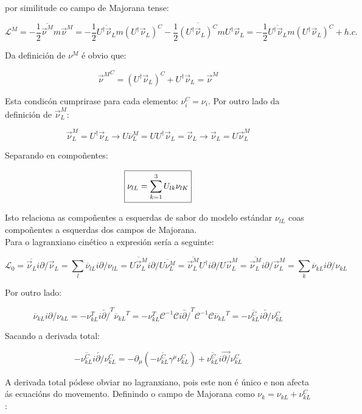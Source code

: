 \documentclass[a4paper,10pt]{article}
\newcommand{\beq}{\begin{equation}}
\newcommand{\eeq}{\end{equation}}
\newcommand{\bbx}{\begin{boxed}}
\newcommand{\ebx}{\end{boxed}}
\newcommand{\barra}[1]{\overline{#1}}
\newcommand{\h}[1]{#1^\dagger}
\newcommand{\lvec}[1]{\overleftarrow{#1}}
\newcommand{\rvec}[1]{\overrightarrow{#1}}
\newcommand{\chula}[1]{\mathcal{#1}}
\newcommand{\slx}[1]{ #1\!\!\!/ }
\begin{document}
por similitude co campo de Majorana tense:

\beq
\chula L^M = -\frac{1}{2} \barra{\rvec\nu^M} m \rvec\nu^M = -\frac{1}{2} \barra{\h U \rvec\nu_L} m \left( \h U \rvec\nu_L  \right)^C - \frac{1}{2} \barra{\left( \h U \rvec\nu_L \right)^C} m \h U \rvec\nu_L = -\frac{1}{2} \barra{\h U \rvec\nu_L} m \left( \h U \rvec\nu_L \right)^C + h.c.
\eeq

Da definición de $\nu^M$ é obvio que:

\beq
{\rvec\nu^M}^C = \left( \h U \rvec\nu_L \right)^C + \h U \rvec\nu_L = \rvec\nu^M
\eeq

Esta condicón cumprirase para cada elemento: $\nu_i^C=\nu_i$. Por outro lado da definición de $\rvec\nu_L^M$:

\beq
\rvec\nu_L^M = \h U \rvec\nu_L \rightarrow U \barra\nu_L^M = U \h U \rvec\nu_L = \rvec\nu_L \rightarrow \rvec\nu_L = U \rvec\nu_L^M
\eeq

Separando en compoñentes:

\beq
\bbx{
\nu_{lL} = \sum_{k=1}^3 U_{lk} \nu_{lK}
}\ebx
\eeq

Isto relaciona as compoñentes a esquerdas de sabor do modelo estándar $\nu_{lL}$ coas compoñentes a esquerdas dos campos de Majorana. \\
Para o lagranxiano cinético a expresión sería a seguinte:

\beq
\chula L_0 = \barra{\rvec\nu_L} i \slx\partial \rvec\nu_L = \sum_l \barra\nu_{lL} i \slx\partial \nu_{lL} = \barra{U \rvec\nu_L^M} i \slx\partial \barra{U\nu_L^M} = \barra{\rvec\nu_L^M} \h U i \slx\partial U \rvec\nu_L^M = \barra{\rvec\nu_L^M} i \slx\partial \rvec\nu_L^M = \sum_k \barra\nu_{kL} i \slx\partial \nu_{kL}
\eeq

Por outro lado:

\beq
\barra\nu_{kL} i \slx\partial \nu_{kL} = - \nu_{kL}^T i \lvec{\slx\partial}^T {\barra\nu_{kL}}^T = - \nu_{kL}^T \chula C^{-1} \chula C i \lvec{\slx\partial}^T \chula C^{-1} \chula C {\barra\nu_{kL}}^T = - \barra{\nu_{kL}^C} i \lvec{\slx\partial} \nu_{kL}^C
\eeq

Sacando a derivada total:

\beq
-\barra{\nu_{kL}^C} i \lvec{\slx\partial} \nu_{kL}^C = -\partial_\mu \left( -\barra{\nu_{kL}^C} \gamma^\mu \nu_{kL}^C \right) + \barra{\nu_{kL}^C} i \rvec{\slx\partial} \nu_{kL}^C
\eeq

A derivada total pódese obviar no lagranxiano, pois este non é único e non afecta ás ecuacións do movemento. Definindo o campo de Majorana como $\nu_k = \nu_{kL} + \nu_{kL}^C $:
\end{document}
